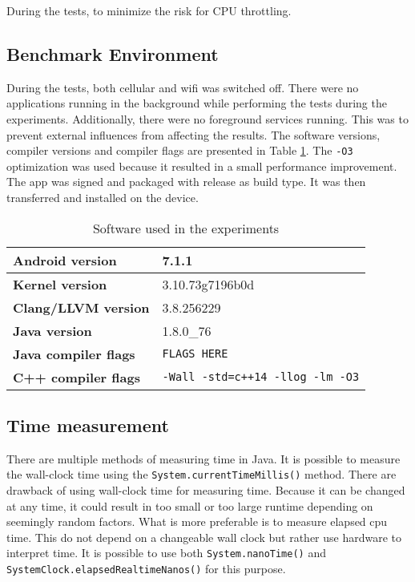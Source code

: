 During the tests,  to minimize the risk for CPU throttling.

\subsection{Benchmark Environment}
During the tests, both cellular and wifi was switched off. There were no applications running in the background while performing the tests during the experiments. Additionally, there were no foreground services running. This was to prevent external influences from affecting the results. The software versions, compiler versions and compiler flags are presented in Table \ref{tab:software}. The \texttt{-O3} optimization was used because it resulted in a small performance improvement. The app was signed and packaged with release as build type. It was then transferred and installed on the device.

\begin{table}[H]
    \centering
    \caption{Software used in the experiments}
    \begin{tabular}{|l|l|}
        \hline
        \textbf{Android version} & 7.1.1\\
        \hline
        \textbf{Kernel version} & 3.10.73g7196b0d\\
        \hline
        \textbf{Clang/LLVM version} & 3.8.256229\\
        \hline
        \textbf{Java version} & 1.8.0\_76\\
        \hline
        \textbf{Java compiler flags} & \texttt{FLAGS HERE}\\
        \hline
        \textbf{C++ compiler flags} & \texttt{-Wall -std=c++14 -llog -lm -O3}\\
        \hline
    \end{tabular}
    \label{tab:software}
\end{table}


\subsection{Time measurement}
There are multiple methods of measuring time in Java. It is possible to measure the wall-clock time using the \texttt{System.currentTimeMillis()} method. There are drawback of using wall-clock time for measuring time. Because it can be changed at any time, it could result in too small or too large runtime depending on seemingly random factors. What is more preferable is to measure elapsed cpu time. This do not depend on a changeable wall clock but rather use hardware to interpret time. It is possible to use both \texttt{System.nanoTime()} and \texttt{SystemClock.elapsedRealtimeNanos()} for this purpose.

